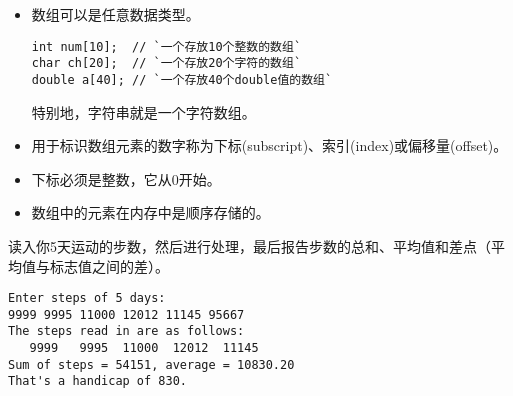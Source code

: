 \begin{frame}[fragile]\ft{\secname}
\begin{itemize}
\item
数组可以是任意数据类型。
\begin{lstlisting}
int num[10];  // `一个存放10个整数的数组`
char ch[20];  // `一个存放20个字符的数组`
double a[40]; // `一个存放40个double值的数组`
\end{lstlisting}
特别地，字符串就是一个字符数组。
\end{itemize}
\end{frame}

\begin{frame}[fragile]\ft{\secname}
\begin{itemize}
\item
用于标识数组元素的数字称为下标(subscript)、索引(index)或偏移量(offset)。
\\[0.1in]
\item 下标必须是整数，它从0开始。\\[0.1in]
\item 数组中的元素在内存中是顺序存储的。
\end{itemize}
\end{frame}

\begin{frame}[fragile]
\begin{li}
读入你5天运动的步数，然后进行处理，最后报告步数的总和、平均值和差点（平均值与标志值之间的差）。
\end{li}
\end{frame}


\begin{frame}\ft{\secname}

\end{frame}


\begin{frame}[fragile]\ft{\secname}
  \begin{lstlisting}
Enter steps of 5 days:
9999 9995 11000 12012 11145 95667
The steps read in are as follows:
   9999   9995  11000  12012  11145
Sum of steps = 54151, average = 10830.20
That's a handicap of 830.
\end{lstlisting}
\end{frame}
 
